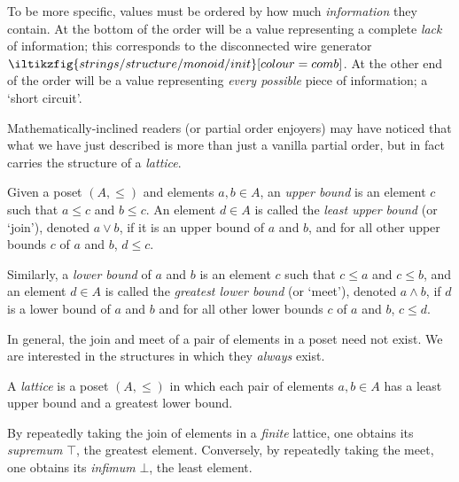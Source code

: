To be more specific, values must be ordered by how much \emph{information} they
contain.
At the bottom of the order will be a value representing a complete \emph{lack}
of information; this corresponds to the disconnected wire generator \(
    \iltikzfig{strings/structure/monoid/init}[colour=comb]
\).
At the other end of the order will be a value representing \emph{every possible}
piece of information; a `short circuit'.

Mathematically-inclined readers (or partial order enjoyers) may have noticed
that what we have just described is more than just a vanilla partial order, but
in fact carries the structure of a \emph{lattice}.

\begin{definition}
    Given a poset \((A, \leq)\) and elements \(a, b\in A\), an
    \emph{upper bound} is an element \(c\) such that \(a \leq c\) and
    \(b \leq c\).
    An element \(d \in A\) is called the \emph{least upper bound} (or `join'),
    denoted \(a \vee b\), if it is an upper bound of \(a\) and \(b\), and for
    all other upper bounds \(c\) of \(a\) and \(b\), \(d \leq c\).

    Similarly, a \emph{lower bound} of \(a\) and \(b\) is an element \(c\) such
    that \(c \leq a\) and \(c \leq b\), and an element \(d \in A\) is called the
    \emph{greatest lower bound} (or `meet'), denoted \(a \wedge b\), if \(d\) is
    a lower bound of \(a\) and \(b\) and for all other lower bounds \(c\) of
    \(a\) and \(b\), \(c \leq d\).
\end{definition}

In general, the join and meet of a pair of elements in a poset need not exist.
We are interested in the structures in which they \emph{always} exist.

\begin{definition}[Lattice]
    A \emph{lattice} is a poset \((A, \leq)\) in which each pair of elements
    \(a,b \in A\) has a least upper bound and a greatest lower bound.
\end{definition}

By repeatedly taking the join of elements in a \emph{finite} lattice, one
obtains its \emph{supremum} \(\top\), the greatest element.
Conversely, by repeatedly taking the meet, one obtains its \emph{infimum}
\(\bot\), the least element.

